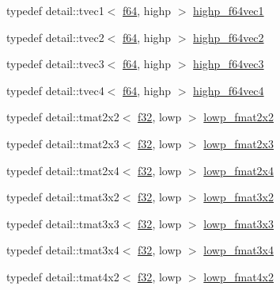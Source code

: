 \begin{CompactItemize}
\item 
typedef detail::tvec1$<$ \hyperlink{group__gtc__type__precision_g2bba392e555124b36cde6abba349bab3}{f64}, highp $>$ \hyperlink{group__gtc__type__precision_g1054b4e4da2b907b35e1806bd6fbaef1}{highp\_\-f64vec1}
\item 
typedef detail::tvec2$<$ \hyperlink{group__gtc__type__precision_g2bba392e555124b36cde6abba349bab3}{f64}, highp $>$ \hyperlink{group__gtc__type__precision_g1efd4982eaeafae59ce40deb89e018e7}{highp\_\-f64vec2}
\item 
typedef detail::tvec3$<$ \hyperlink{group__gtc__type__precision_g2bba392e555124b36cde6abba349bab3}{f64}, highp $>$ \hyperlink{group__gtc__type__precision_g93cbac95bb9106fe15c987c0f56ae679}{highp\_\-f64vec3}
\item 
typedef detail::tvec4$<$ \hyperlink{group__gtc__type__precision_g2bba392e555124b36cde6abba349bab3}{f64}, highp $>$ \hyperlink{group__gtc__type__precision_g1e9d8145fb9521701a5eeb6df5754184}{highp\_\-f64vec4}
\item 
typedef detail::tmat2x2$<$ \hyperlink{group__gtc__type__precision_g0ec999b57f5330d9021256e96038df04}{f32}, lowp $>$ \hyperlink{group__gtc__type__precision_g99367a30c64035d7e7f76410105d10e3}{lowp\_\-fmat2x2}
\item 
typedef detail::tmat2x3$<$ \hyperlink{group__gtc__type__precision_g0ec999b57f5330d9021256e96038df04}{f32}, lowp $>$ \hyperlink{group__gtc__type__precision_g01c5c29a6cee22c3e75de25c98dbecc9}{lowp\_\-fmat2x3}
\item 
typedef detail::tmat2x4$<$ \hyperlink{group__gtc__type__precision_g0ec999b57f5330d9021256e96038df04}{f32}, lowp $>$ \hyperlink{group__gtc__type__precision_g14b4460b2132fd3db19b53ec6f9353f2}{lowp\_\-fmat2x4}
\item 
typedef detail::tmat3x2$<$ \hyperlink{group__gtc__type__precision_g0ec999b57f5330d9021256e96038df04}{f32}, lowp $>$ \hyperlink{group__gtc__type__precision_g6e03c9a11f7d781af7549ce566844cc6}{lowp\_\-fmat3x2}
\item 
typedef detail::tmat3x3$<$ \hyperlink{group__gtc__type__precision_g0ec999b57f5330d9021256e96038df04}{f32}, lowp $>$ \hyperlink{group__gtc__type__precision_g25b389b52269f3256f015b4fff5789c2}{lowp\_\-fmat3x3}
\item 
typedef detail::tmat3x4$<$ \hyperlink{group__gtc__type__precision_g0ec999b57f5330d9021256e96038df04}{f32}, lowp $>$ \hyperlink{group__gtc__type__precision_g366a3249a72ddc76fb3ee4f2379cf3fb}{lowp\_\-fmat3x4}
\item 
typedef detail::tmat4x2$<$ \hyperlink{group__gtc__type__precision_g0ec999b57f5330d9021256e96038df04}{f32}, lowp $>$ \hyperlink{group__gtc__type__precision_g2433f92674e42eb6a75384fbab262306}{lowp\_\-fmat4x2}

\end{CompactItemize}
